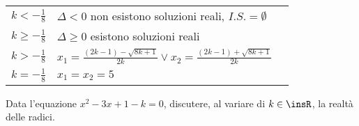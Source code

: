 \begin{exrig}
\begin{esempio}
\begin{center}
\begin{tabular}{lll}
$k < - \frac{1}{8}$ & $\Delta < 0$ non esistono soluzioni reali, $I.S. = \emptyset$& \\
$k \geq - \frac{1}{8}$ & $\Delta \geq 0$ esistono soluzioni reali & \\
$k > - \frac{1}{8}$ & $x_{1}=\frac{\left( 2 k - 1 \right) - \sqrt{8 k + 1}}{2k}\vee x_{2}=\frac{\left( 2 k - 1 \right) + \sqrt{8 k + 1}}{2 k}$ & \\
$k = - \frac{1}{8}$ & $x_{1} = x_{2}=5$ &\\
\bottomrule
\end{tabular}
\end{center}
\end{esempio}

\begin{esempio}
Data l'equazione $x^2 - 3 x + 1 - k = 0$, discutere, al variare di $k \in \insR$, la realtà delle radici.


\end{esempio}
\end{exrig}
